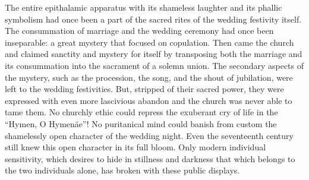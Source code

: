 The entire epithalamic apparatus with its shameless laughter and its
phallic symbolism had once been a part of the sacred rites of the
wedding festivity itself. The consummation of marriage and the wedding
ceremony had once been inseparable: a great mystery that focused on
copulation. Then came the church and claimed sanctity and mystery for
itself by transposing both the marriage and its consummation into the
sacrament of a solemn union. The secondary aspects of the mystery, such
as the procession, the song, and the shout of jubilation, were left to
the wedding festivities. But, stripped of their sacred power, they were
expressed with even more lascivious abandon and the church was never
able to tame them. No churchly ethic could repress the exuberant cry of
life in the ``Hymen, O Hymenäe''! No puritanical mind could banish from
custom the shamelessly open character of the wedding night. Even the
seventeenth century still knew this open character in its full bloom.
Only modern individual sensitivity, which desires to hide in stillness
and darkness that which belongs to the two individuals alone, has broken
with these public displays.

